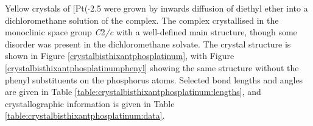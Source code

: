 Yellow crystals of [Pt(\Phthixantphos\ce{)2]}$\cdot$2.5  were grown by inwards diffusion of diethyl ether into a dichloromethane solution of the complex.  The complex crystallised in the monoclinic space group \emph{C}2\emph{/c} with a well-defined main structure, though some disorder was present in the dichloromethane solvate.  The crystal structure is shown in Figure \ref{crystalbisthixantphosplatinum}, with Figure \ref{crystalbisthixantphosplatinumphenyl} showing the same structure without the phenyl substituents on the phosphorus atoms.  Selected bond lengths and angles are given in Table \ref{table:crystalbisthixantphosplatinum:lengths}, and crystallographic information is given in Table \ref{table:crystalbisthixantphosplatinum:data}.  


